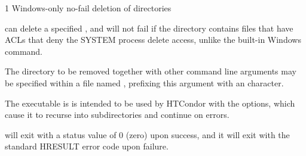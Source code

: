 \begin{ManPage}{\label{man-condor-rmdir}}{1}
{Windows-only no-fail deletion of directories}

\Synopsis
{}



\Description 

 can delete a specified ,
and will not fail if the directory contains files that have ACLs 
that deny the SYSTEM process delete access,
unlike the built-in Windows  command. 

The directory to be removed together with other command line arguments
may be specified within a file named ,
prefixing this argument with an  character.

The  executable is is intended to be used  
by HTCondor with the    options, 
which cause it to recurse into subdirectories and continue on errors.

\begin{Options}










\end{Options}

\ExitStatus

 will exit with a status value of 0 (zero) upon success,
and it will exit with the standard HRESULT error code upon failure.

\end{ManPage}
